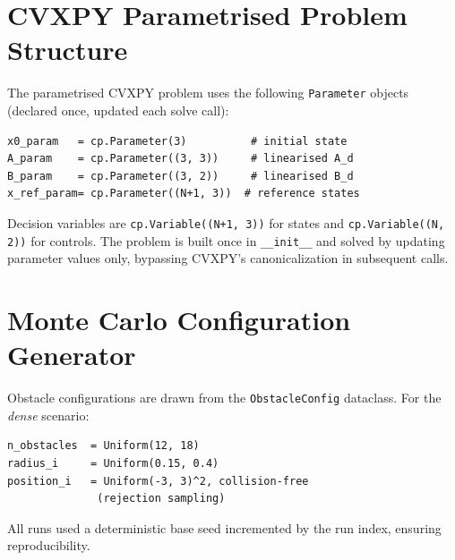 \documentclass[journal]{IEEEtran}
\begin{document}
\section{CVXPY Parametrised Problem Structure}\label{app:cvxpy}

The parametrised CVXPY problem uses the following \texttt{Parameter} objects
(declared once, updated each solve call):
\begin{verbatim}
x0_param   = cp.Parameter(3)          # initial state
A_param    = cp.Parameter((3, 3))     # linearised A_d
B_param    = cp.Parameter((3, 2))     # linearised B_d
x_ref_param= cp.Parameter((N+1, 3))  # reference states
\end{verbatim}
Decision variables are \texttt{cp.Variable((N+1, 3))} for states and
\texttt{cp.Variable((N, 2))} for controls.
The problem is built once in \texttt{\_\_init\_\_} and solved by updating
parameter values only, bypassing CVXPY's canonicalization in subsequent calls.

\section{Monte Carlo Configuration Generator}\label{app:config}

Obstacle configurations are drawn from the \texttt{ObstacleConfig} dataclass.
For the \emph{dense} scenario:
\begin{verbatim}
n_obstacles  = Uniform(12, 18)
radius_i     = Uniform(0.15, 0.4)
position_i   = Uniform(-3, 3)^2, collision-free
              (rejection sampling)
\end{verbatim}
All runs used a deterministic base seed incremented by the run index, ensuring
reproducibility.
\end{document}
